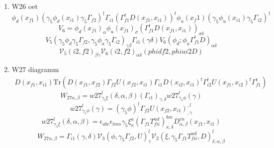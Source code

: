 \documentclass{article}[12pt]
\begin{document}
\begin{itemize}
\begin{enumerate}
\item W26 oet
$$
\phi_d(x_{f1})(\gamma_5\phi_d(x_{i1})\gamma_5\Gamma_{f2})^\dagger
\Gamma_{i1}(\Gamma_{f1}^tD(x_{f1},x_{i1}))^t\phi_u(x_f1)(\gamma_5\phi_u(x_{i1})\gamma_5\Gamma_{i2})^\dagger
$$
$$
V_6=\phi_d(x_{f1})_{\alpha}\phi_u(x_{f1})_{\sigma}(\Gamma_{f1}^tD(x_{f1},x_{i1}))_{\sigma\delta}
$$
$$
V_5(\gamma_5\phi_d\gamma_5\Gamma_{f2},\gamma_5\phi_u\gamma_5\Gamma_{i2})_{\gamma\beta}\Gamma_{i1}(\gamma\delta)V_6(\phi_d;\phi_u\Gamma_{f1}^tD)_{\alpha\delta}
$$
$$
{\mathcal V}_5(i2,f2)_{\beta\gamma}{\mathcal V}_6(i2,f2)_{\alpha\delta}(phidf2,phiui2D)
$$
\item W27 diagramm
\begin{eqnarray}
D(x_{f1},x_{i1})\mathrm{Tr}(D(x_{f1},x_{f2})\Gamma_{f2}U(x_{f2},x_{i1})\Gamma_{i1}D(x_{i2},x_{i1})^t\Gamma_{i2}^tU(x_{f1},x_{i2})^t\Gamma_{f1}^t)
\end{eqnarray}
$$
W_{27\alpha,\beta}=w27_{\gamma_5\xi}^{l}\left(\delta,\alpha,\beta\right)\left(\Gamma_{i1}\right)_{\gamma,\delta}w27_{\gamma_5\phi}^{l}\left(\gamma\right)
$$
$$
w27_{\gamma_5\phi}^{l}\left(\gamma\right)=(\gamma_5\phi)^{\dagger}\Gamma_{f2}U\left(x_{f2},x_{i1}\right)^{,l}_{,\gamma}
$$
$$
w27_{\gamma_5\xi}^{l}\left(\delta,\alpha,\beta\right)=\epsilon_{abc}\epsilon_{lmn}\gamma_5\xi^{a}_{\kappa}\left(\Gamma_{f1}T_{fii}^{ud}\right)^{bm}_{\kappa,\delta}D^{cn}_{\alpha,\beta}\left(x_{f1},x_{i1}\right)
$$
$$
W_{27\alpha,\beta}=\Gamma_{i1}\left(\gamma,\delta\right){\mathcal V}_{3}\left(\phi,\gamma_5\Gamma_{f2},U\right)^{l}_{\gamma}{\mathcal V}_{2}\left(\xi,\gamma_5\Gamma_{f1}T_{fii}^{ud},D\right)^{l}_{\delta,\alpha,\beta}
$$


\end{enumerate}
\end{itemize}
\end{document}
